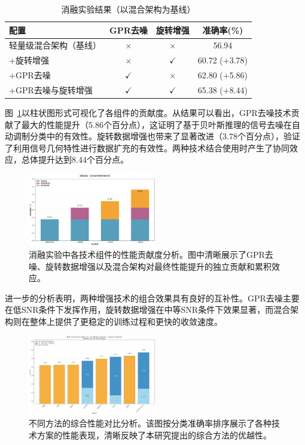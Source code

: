 \documentclass[conference]{IEEEtran}
\begin{document}
\begin{table}[h]
\centering
\caption{消融实验结果（以混合架构为基线）}
\label{tab:ablation_study}
\begin{tabular}{@{}lccc@{}}
\toprule
配置 & GPR去噪 & 旋转增强 & 准确率(\%) \\
\midrule
轻量级混合架构（基线） & $\times$ & $\times$ & 56.94 \\
+旋转增强 & $\times$ & $\checkmark$ & 60.72 (+3.78) \\
+GPR去噪 & $\checkmark$ & $\times$ & 62.80 (+5.86) \\
+GPR去噪与旋转增强 & $\checkmark$ & $\checkmark$ & 65.38 (+8.44) \\
\bottomrule
\end{tabular}
\end{table}

图~\ref{fig:ablation_components}以柱状图形式可视化了各组件的贡献度。从结果可以看出，GPR去噪技术贡献了最大的性能提升（5.86个百分点），这证明了基于贝叶斯推理的信号去噪在自动调制分类中的有效性。旋转数据增强也带来了显著改进（3.78个百分点），验证了利用信号几何特性进行数据扩充的有效性。两种技术结合使用时产生了协同效应，总体提升达到8.44个百分点。

\begin{figure}[htbp]
\centering
\includegraphics[width=0.5\textwidth]{figure/stacked_ablation_analysis.pdf}
\caption{消融实验中各技术组件的性能贡献度分析。图中清晰展示了GPR去噪、旋转数据增强以及混合架构对最终性能提升的独立贡献和累积效应。}
\label{fig:ablation_components}
\end{figure}

进一步的分析表明，两种增强技术的组合效果具有良好的互补性。GPR去噪主要在低SNR条件下发挥作用，旋转数据增强在中等SNR条件下效果显著，而混合架构则在整体上提供了更稳定的训练过程和更快的收敛速度。

\begin{figure}[htbp]
\centering
\includegraphics[width=0.5\textwidth]{figure/sorted_stacked_comparison.png}
\caption{不同方法的综合性能对比分析。该图按分类准确率排序展示了各种技术方案的性能表现，清晰反映了本研究提出的综合方法的优越性。}
\label{fig:method_comparison}
\end{figure}
\end{document}
